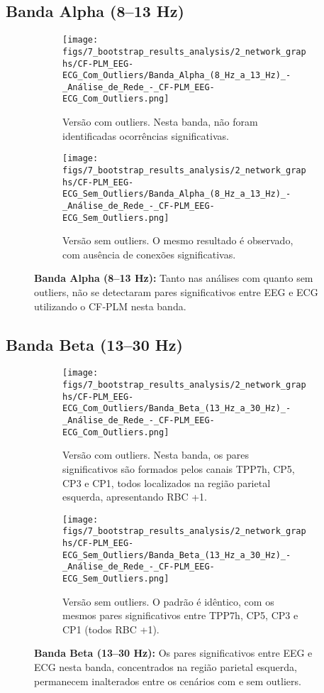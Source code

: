 \subsection{Banda Alpha (8–13 Hz)}
\begin{figure}[H]
    \centering
    \begin{subfigure}[b]{0.48\textwidth}
        \texttt{[image: figs/7\_bootstrap\_results\_analysis/2\_network\_graphs/CF-PLM\_EEG-ECG\_Com\_Outliers/Banda\_Alpha\_(8\_Hz\_a\_13\_Hz)\_-\_Análise\_de\_Rede\_-\_CF-PLM\_EEG-ECG\_Com\_Outliers.png]}
        \caption{\small Versão com outliers. Nesta banda, não foram identificadas ocorrências significativas.}
    \end{subfigure}
    \hfill
    \begin{subfigure}[b]{0.48\textwidth}
        \texttt{[image: figs/7\_bootstrap\_results\_analysis/2\_network\_graphs/CF-PLM\_EEG-ECG\_Sem\_Outliers/Banda\_Alpha\_(8\_Hz\_a\_13\_Hz)\_-\_Análise\_de\_Rede\_-\_CF-PLM\_EEG-ECG\_Sem\_Outliers.png]}
        \caption{\small Versão sem outliers. O mesmo resultado é observado, com ausência de conexões significativas.}
    \end{subfigure}
    \caption[Análise de Rede – Banda Alpha (CF‐PLM EEG–ECG)]{\small \textbf{Banda Alpha (8–13 Hz):} Tanto nas análises com quanto sem outliers, não se detectaram pares significativos entre EEG e ECG utilizando o CF‐PLM nesta banda.}
    \label{fig:rede_alpha_cfplm}
\end{figure}

\subsection{Banda Beta (13–30 Hz)}
\begin{figure}[H]
    \centering
    \begin{subfigure}[b]{0.48\textwidth}
        \texttt{[image: figs/7\_bootstrap\_results\_analysis/2\_network\_graphs/CF-PLM\_EEG-ECG\_Com\_Outliers/Banda\_Beta\_(13\_Hz\_a\_30\_Hz)\_-\_Análise\_de\_Rede\_-\_CF-PLM\_EEG-ECG\_Com\_Outliers.png]}
        \caption{\small Versão com outliers. Nesta banda, os pares significativos são formados pelos canais TPP7h, CP5, CP3 e CP1, todos localizados na região parietal esquerda, apresentando RBC +1.}
    \end{subfigure}
    \hfill
    \begin{subfigure}[b]{0.48\textwidth}
        \texttt{[image: figs/7\_bootstrap\_results\_analysis/2\_network\_graphs/CF-PLM\_EEG-ECG\_Sem\_Outliers/Banda\_Beta\_(13\_Hz\_a\_30\_Hz)\_-\_Análise\_de\_Rede\_-\_CF-PLM\_EEG-ECG\_Sem\_Outliers.png]}
        \caption{\small Versão sem outliers. O padrão é idêntico, com os mesmos pares significativos entre TPP7h, CP5, CP3 e CP1 (todos RBC +1).}
    \end{subfigure}
    \caption[Análise de Rede – Banda Beta (CF‐PLM EEG–ECG)]{\small \textbf{Banda Beta (13–30 Hz):} Os pares significativos entre EEG e ECG nesta banda, concentrados na região parietal esquerda, permanecem inalterados entre os cenários com e sem outliers.}
    \label{fig:rede_beta_cfplm}
\end{figure}

